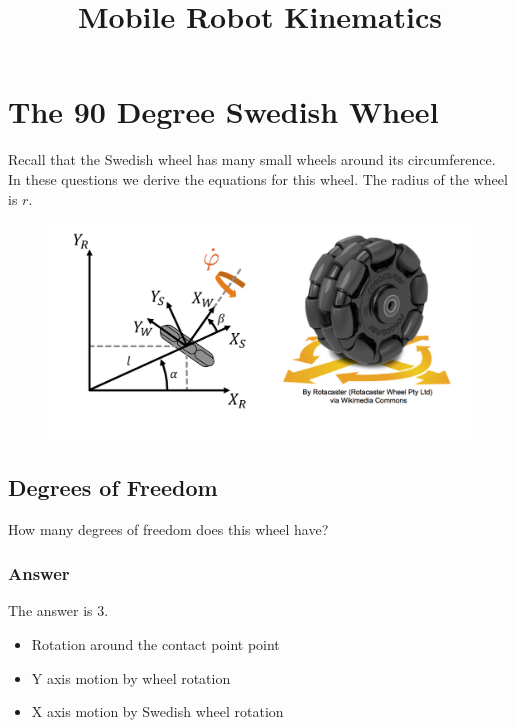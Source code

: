 \documentclass[12pt]{article}
\begin{document}
 
 
\title{Mobile Robot Kinematics}
\date{\vspace{-20mm}}
\maketitle

\section*{The 90 Degree Swedish Wheel}

Recall that the Swedish wheel has many small wheels around its circumference. In these questions we derive the equations for this wheel. The radius of the wheel is $r$. \\

\begin{figure}[h]
	\centering
	\includegraphics[width=0.8\linewidth]{diagram_2_v100}
\end{figure}
 
\subsection*{Degrees of Freedom}

How many degrees of freedom does this wheel have?

\subsubsection*{Answer}

The answer is 3.

\begin{itemize}
	\item Rotation around the contact point point 
	\item Y axis motion by wheel rotation
	\item X axis motion by Swedish wheel rotation
\end{itemize}
\end{document}
